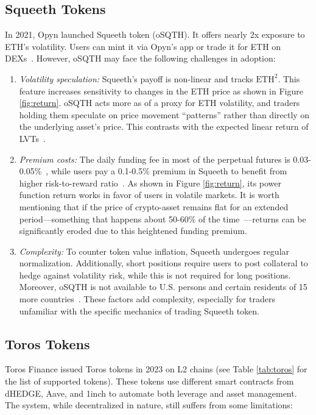 \subsection{Squeeth Tokens}\label{subsec:squeeth}
In 2021, Opyn launched Squeeth token (oSQTH). It offers nearly 2x exposure to ETH's volatility. Users can mint it via Opyn's app or trade it for ETH on DEXs~\cite{Squeeth_Doc}. However, oSQTH may face the following challenges in adoption:
\begin{enumerate}[label={\ref{subsec:squeeth}.\arabic*},leftmargin=*]
	\item \textit{Volatility speculation:} Squeeth's payoff is non-linear and tracks \( \text{ETH}^2 \). This feature increases sensitivity to changes in the ETH price as shown in Figure \ref{fig:return}. oSQTH acts more as of a proxy for ETH volatility, and traders holding them speculate on price movement ``patterns'' rather than directly on the underlying asset's price. This contrasts with the expected linear return of LVTs~\cite{Squeeth_Medium}.
	
	\item \textit{Premium costs:} The daily funding fee in most of the perpetual futures is 0.03-0.05\%~\cite{Coinglass_Funding}, while users pay a 0.1-0.5\% premium in Squeeth to benefit from higher risk-to-reward ratio~\cite{Squeeth_Funding}. As shown in Figure \ref{fig:return}, its power function return works in favor of users in volatile markets. It is worth mentioning that if the price of crypto-asset remains flat for an extended period—something that happens about 50-60\% of the time~\cite{bulkowski2011encyclopedia,edwards2007technical}—returns can be significantly eroded due to this heightened funding premium.
	
	\item \textit{Complexity:} To counter token value inflation, Squeeth undergoes regular normalization. Additionally, short positions require users to post collateral to hedge against volatility risk, while this is not required for long positions. Moreover, oSQTH is not available to U.S. persons and certain residents of 15 more countries~\cite{Squeeth_Restricted}. These factors add complexity, especially for traders unfamiliar with the specific mechanics of trading Squeeth token.
\end{enumerate}


\subsection{Toros Tokens}\label{subsec:toros}
Toros Finance issued Toros tokens in 2023 on L2 chains (see Table \ref{tab:toros} for the list of supported tokens). These tokens use different smart contracts from dHEDGE, Aave, and 1inch to automate both leverage and asset management. The system, while decentralized in nature, still suffers from some limitations:

